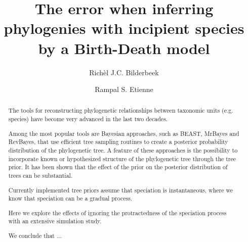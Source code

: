\documentclass{article}
\title{The error when inferring phylogenies with incipient species by a Birth-Death model}
\author[1]{Rich\`el J.C. Bilderbeek}
\author[1]{Rampal S. Etienne}
\affil[1]{Groningen Institute for Evolutionary Life Sciences, University of Groningen, Groningen, The Netherlands}
\begin{document}
\maketitle

\begin{abstract}



  The tools for reconstructing phylogenetic relationships between taxonomic 
  units (e.g. species) have become very advanced in the last two decades. 

  Among the most popular tools are Bayesian approaches, such as BEAST, MrBayes and RevBayes, 
  that use efficient tree sampling routines to create a posterior probability distribution 
  of the phylogenetic tree. 
  A feature of these approaches is the possibility to incorporate 
  known or hypothesized structure of the phylogenetic tree through the tree prior. 
  It has been shown that the effect of the prior on the posterior distribution 
  of trees can be substantial. 

  Currently implemented tree priors assume that speciation is instantaneous,
  where we know that speciation can be a gradual process.

  Here we explore the effects of ignoring 
  the protractedness of the speciation process with an extensive simulation study. 




  We conclude that ...


\end{abstract}
\end{document}
